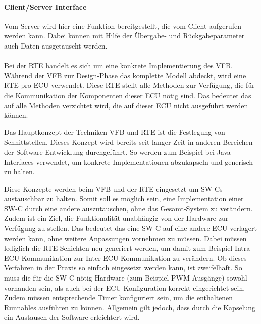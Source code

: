\documentclass[
  a4paper,					    %
  twoside,
  DIV=calc,     				%
  bibliography=totoc,
  cleardoublepage=empty,
  ngerman,     					%
  final       					%
]{scrbook}
\begin{document}
\paragraph{Client/Server Interface}
Vom Server wird hier eine Funktion bereitgestellt, die vom Client aufgerufen werden kann. Dabei können mit Hilfe der Übergabe- und Rückgabeparameter auch Daten ausgetauscht werden.

\paragraph{}
Bei der RTE handelt es sich um eine konkrete Implementierung des VFB. Während der VFB zur Design-Phase das komplette Modell abdeckt, wird eine RTE pro ECU verwendet. Diese RTE stellt alle Methoden zur Verfügung, die für die Kommunikation der Komponenten dieser ECU nötig sind. Das bedeutet das auf alle Methoden verzichtet wird, die auf dieser ECU nicht ausgeführt werden können.

Das Hauptkonzept der Techniken VFB und RTE ist die Festlegung von Schnittstellen. Dieses Konzept wird bereits seit langer Zeit in anderen Bereichen der Software-Entwicklung durchgeführt. So werden zum Beispiel bei Java Interfaces verwendet, um konkrete Implementationen abzukapseln und generisch zu halten. 

Diese Konzepte werden beim VFB und der RTE eingesetzt um SW-Cs austauschbar zu halten. Somit soll es möglich sein, eine Implementation einer SW-C durch eine andere auszutauschen, ohne das Gesamt-System zu verändern. Zudem ist ein Ziel, die Funktionalität unabhängig von der Hardware zur Verfügung zu stellen. Das bedeutet das eine SW-C auf eine andere ECU verlagert werden kann, ohne weitere Anpassungen vornehmen zu müssen. Dabei müssen lediglich die RTE-Schichten neu generiert werden, um damit zum Beispiel Intra-ECU Kommunikation zur Inter-ECU Kommunikation zu verändern. Ob dieses Verfahren in der Praxis so einfach eingesetzt werden kann, ist zweifelhaft. So muss die für die SW-C nötig Hardware (zum Beispiel PWM-Ausgänge) sowohl vorhanden sein, als auch bei der ECU-Konfiguration korrekt eingerichtet sein. Zudem müssen entsprechende Timer konfiguriert sein, um die enthaltenen Runnables ausführen zu können. Allgemein gilt jedoch, dass durch die Kapselung ein Austausch der Software erleichtert wird.
\end{document}
